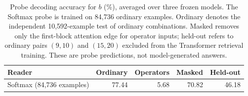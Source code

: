 \begin{table}[H]
\centering\revisioncolor\small
\setlength{\tabcolsep}{5pt}
\caption{Probe decoding accuracy for $b$ (\%), averaged over three frozen models. The Softmax probe is trained on 84,736 ordinary examples. Ordinary denotes the independent 10,592-example test of ordinary combinations. Masked removes only the first-block attention edge for operator inputs; held-out refers to ordinary pairs $(9,10)$ and $(15,20)$ excluded from the Transformer retrieval training. These are probe predictions, not model-generated answers.}
\label{tab:probe-main}
\begin{tabular}{@{}lrrrr@{}}
\toprule
Reader & Ordinary & Operators & Masked & Held-out \\
\midrule
Softmax (84,736 examples) & 77.44 & 5.68 & 70.82 & 46.18 \\
\bottomrule
\end{tabular}
\end{table}
